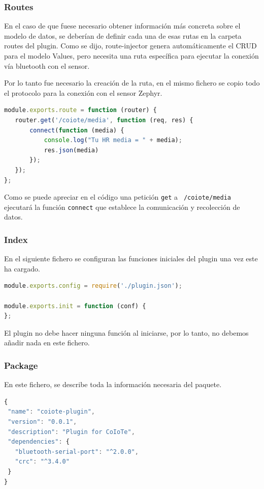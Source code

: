 \subsubsection{Routes}

En el caso de que fuese necesario obtener información más concreta sobre el
modelo de datos, se deberían de definir cada una de esas rutas en la carpeta
routes del plugin. Como se dijo, route-injector genera automáticamente el CRUD para el modelo Values, pero necesita una ruta específica para ejecutar la conexión vía bluetooth con el sensor. 

Por lo tanto fue necesario la creación de la ruta, en el mismo fichero se copio todo el protocolo para la conexión con el sensor Zephyr. 

\begin{lstlisting}[language=JavaScript]
module.exports.route = function (router) {
   router.get('/coiote/media', function (req, res) {
       connect(function (media) {
           console.log("Tu HR media = " + media);
           res.json(media)
       });
   });
};
\end{lstlisting}

Como se puede apreciar en el código una petición \texttt{get} a \texttt{ /coiote/media } ejecutará la función \texttt{connect} que establece la comunicación y recolección de datos.  

\subsubsection{Index}

En el siguiente fichero se configuran las funciones iniciales del plugin una vez
este ha cargado.

\begin{lstlisting}[language=JavaScript]
module.exports.config = require('./plugin.json');

module.exports.init = function (conf) { 
};
\end{lstlisting}

El plugin no debe hacer ninguna función al iniciarse, por lo tanto, no debemos añadir nada en este fichero.
\pagebreak
\subsubsection{Package} 

En este fichero, se describe toda la información necesaria del paquete. 

\begin{lstlisting}[language=JavaScript]
{
 "name": "coiote-plugin",
 "version": "0.0.1",
 "description": "Plugin for CoIoTe",
 "dependencies": {
   "bluetooth-serial-port": "^2.0.0",
   "crc": "^3.4.0"
 }
}
\end{lstlisting}

